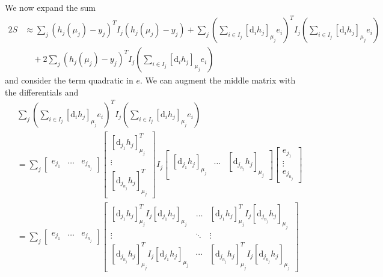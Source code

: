 We now expand the sum
$$
  \begin{aligned}
    2S & \approx \sum_j \left( h_j(\mu_j) - y_j \right)^T I_j \left( h_j(\mu_j) - y_j \right) + \sum_j \left( \sum_{i \in I_j} [\mathrm{d}_i h_j]_{\mu_j} e_i \right)^T I_j \left( \sum_{i \in I_j} [\mathrm{d}_i h_j]_{\mu_j} e_i \right) \\
       & \quad + 2 \sum_j \left( h_j(\mu_j) - y_j \right)^T I_j \left( \sum_{i \in I_j} [\mathrm{d}_i h_j]_{\mu_j} e_i \right)
  \end{aligned}
$$
and consider the term quadratic in $e$. We can augment the middle matrix with the differentials and
$$
  \begin{aligned}
     & \sum_j \left( \sum_{i \in I_j} [\mathrm{d}_i h_j]_{\mu_j} e_i \right)^T I_j \left( \sum_{i \in I_j} [\mathrm{d}_i h_j]_{\mu_j} e_i \right)                                                                        \\
     & = \sum_j \begin{bmatrix}
      e_{j_1} & \ldots & e_{j_{n_j}}
    \end{bmatrix} \begin{bmatrix}
      [\mathrm{d}_{j_1} h_j]_{\mu_j}^T \\ \vdots \\ [\mathrm{d}_{j_{n_j}} h_j]_{\mu_j}^T
    \end{bmatrix} I_j \begin{bmatrix}
      [\mathrm{d}_{j_1} h_j]_{\mu_j} & \dots & [\mathrm{d}_{j_{n_j}} h_j]_{\mu_j}
    \end{bmatrix}
    \begin{bmatrix}
      e_{j_1} \\ \vdots \\ e_{j_{n_j}}
    \end{bmatrix}                                                                                                                                                                                            \\
     & = \sum_j \begin{bmatrix}
      e_{j_1} & \ldots & e_{j_{n_j}}
    \end{bmatrix} \begin{bmatrix}
      [\mathrm{d}_{j_1} h_j]_{\mu_j}^T I_j [\mathrm{d}_{j_1} h_j]_{\mu_j} & \dots & [\mathrm{d}_{j_{1}} h_j]_{\mu_j}^T I_j [\mathrm{d}_{j_{n_j}} h_j]_{\mu_j} \\ \vdots & \ddots & \vdots \\ [\mathrm{d}_{j_{n_j}} h_j]_{\mu_j}^T I_j [\mathrm{d}_{j_{1}} h_j]_{\mu_j} & \cdots & [\mathrm{d}_{j_{n_j}} h_j]_{\mu_j}^T I_j [\mathrm{d}_{j_{n_j}} h_j]_{\mu_j}

\end{bmatrix}
\end{aligned}$$
